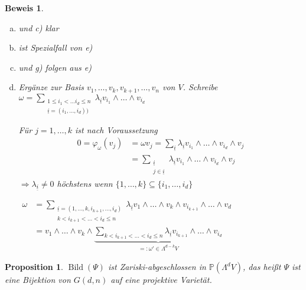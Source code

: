 \documentclass[a4paper, 12pt, numbers=noendperiod, chapterprefix=true]{scrbook}
\theoremstyle{break}
\newtheorem{Prop}[Def]{Proposition}
\theoremstyle{nonumberbreak}
\newtheorem{Bew}{Beweis}
\theoremstyle{nonumberplain}
\newcommand{\Sum}{\sum\limits}
\DeclareMathOperator{\Bild}{Bild}
\newcommand{\IP}{\mathbb{P}}%
\begin{document}
\begin{Bew}\begin{enumerate}[a)]
\item[b)]
	und c) klar
\item[d)]
	ist Spezialfall von e)
\item[f)]
	und g) folgen aus e)
\item[e)]
	Erg\"anze zur Basis $v_1,\ldots ,v_k,v_{k+1},\ldots ,v_n$ von $V$. Schreibe $\omega=\Sum_{\substack{1\le i_1<\ldots i_d\le n \\ \underline{i}=(i_1,\ldots ,i_d))}} \lambda_{\underline{i}}v_{i_1}\wedge\ldots \wedge v_{i_d}$
	
	F\"ur $j=1,\ldots ,k$ ist nach Voraussetzung
	\[\begin{array}{rl}
		0=\varphi_{\omega}(v_j)&=\omega v_j=\Sum_{\underline i} \lambda_{\underline{i}}v_{i_1}\wedge\ldots \wedge v_{i_d}\wedge v_j\\
		&=\Sum_{\substack{\underline i\\j\in \underline i}} \lambda_{\underline{i}}v_{i_1}\wedge\ldots \wedge v_{i_d}\wedge v_j
	\end{array}\]
	$\Rightarrow \lambda_{\underline i} \neq 0$ h\"ochstens wenn $\{1,\ldots ,k\}\subseteq\{i_1,\ldots ,i_d\}$
	
	$\begin{array}{rl}\omega&= \Sum_{\substack{\underline{i} =(1,\ldots,k,i_{k+1},\ldots, i_d)\\k<i_{k+1}<\ldots<i_d\le n}} \lambda_{\underline i} v_1\wedge\ldots \wedge v_k \wedge v_{i_{k+1}} \wedge \ldots \wedge v_d\\
	&= v_1 \wedge\ldots \wedge v_k \wedge \underbrace{\Sum_{k<i_{k+1}<\ldots <i_d\le n} \lambda_{\underline i} v_{i_{k+1}}\wedge\ldots \wedge v_{i_d}}_{=: \omega'\in\Lambda^{d-k}V}\end{array}$
\end{enumerate}\end{Bew}

\begin{Prop}
$\Bild(\Psi)$ ist Zariski-abgeschlossen in $\IP(\Lambda^dV)$, das hei\ss t $\Psi$ ist eine Bijektion von $G(d,n)$ auf eine projektive Variet\"at.
\end{Prop}
\end{document}
